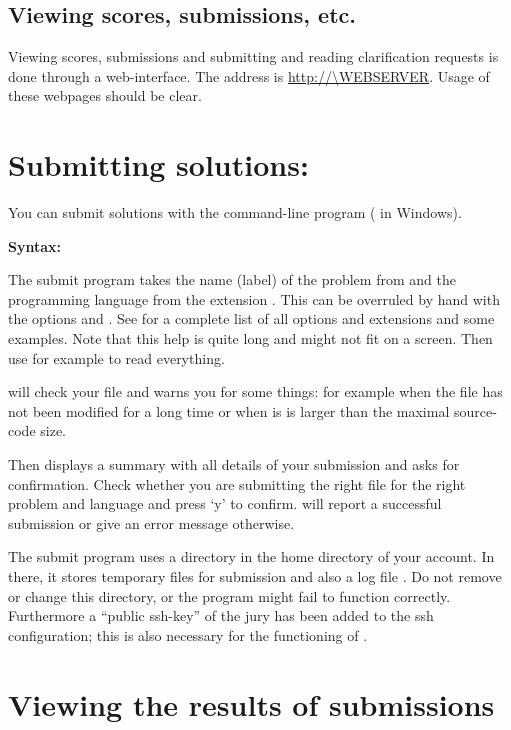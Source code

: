 \subsection{Viewing scores, submissions, etc.}

Viewing scores, submissions and submitting and reading clarification
requests is done through a web-interface. The address is
\url{http://\WEBSERVER}. Usage of these webpages should be clear.

\newpage
\section{Submitting solutions: }\label{submit}

You can submit solutions with the command-line program 
( in Windows).

\textbf{Syntax:} 

The submit program takes the name (label) of the problem from
 and the programming language from the extension
. This can be overruled by hand with the options
 and .
See  for a complete list of all options and
extensions and some examples. Note that this help is quite long and
might not fit on a screen. Then use for example
 to read everything.

 will check your file and warns you for some things:
for example when the file has not been modified for a long time or
when is is larger than the maximal source-code size.

Then  displays a summary with all details of your
submission and asks for confirmation. Check whether you are submitting
the right file for the right problem and language and press `y' to
confirm.  will report a successful submission or give
an error message otherwise.

The submit program uses a directory \cmd{\USERSUBMITDIR} in the
home directory of your account. In there, it stores temporary files for
submission and also a log file . Do not remove or
change this directory, or the  program might fail to
function correctly. Furthermore a ``public ssh-key'' of the jury has
been added to the ssh configuration; this is also necessary for the
functioning of .

\section{Viewing the results of submissions}

